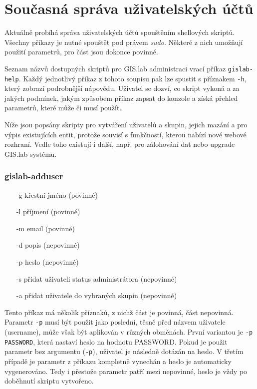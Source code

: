 \section{Současná správa uživatelských účtů}
\label{cmd-line}

Aktuálně probíhá správa uživatelských účtů spouštěním shellových skriptů. Všechny příkazy je nutné spouštět pod právem \textit{sudo}. Některé z nich umožňují použití parametrů, pro část jsou dokonce povinné.

Seznam názvů dostupných skriptů pro GIS.lab administraci vrací příkaz \texttt{gislab-help}. Každý jednotlivý příkaz z tohoto soupisu pak lze spustit s příznakem \texttt{-h}, který zobrazí podrobnější nápovědu. Uživatel se dozví, co skript vykoná a za jakých podmínek, jakým způsobem příkaz zapsat do konzole a získá přehled parametrů, které může či musí použít.

Níže jsou popsány skripty pro vytváření uživatelů a skupin, jejich mazání a pro výpis existujících entit, protože souvisí s funkčností, kterou nabízí nové webové rozhraní. Vedle toho existují i další, např. pro zálohování dat nebo upgrade GIS.lab systému.


\subsubsection{gislab-adduser}
\begin{itemize}
\item [-g] křestní jméno (povinné)
\item [-l] příjmení (povinné)
\item [-m] email (povinné)
\item [-d] popis (nepovinné)
\item [-p] heslo (nepovinné)
\item [-s] přidat uživateli status administrátora (nepovinné)
\item [-a] přidat uživatele do vybraných skupin (nepovinné)
\end{itemize}
Tento příkaz má několik příznaků, z nichž část je povinná, část nepovinná. Parametr \texttt{-p} musí být použit jako poslední, těsně před názvem uživatele (username), může však být aplikován v různých obměnách. První variantou je \texttt{-p PASSWORD}, která nastaví heslo na hodnotu PASSWORD. Pokud je použit parametr bez argumentu (\texttt{-p}), uživatel je následně dotázán na heslo. V třetím případě je parametr z příkazu kompletně vynechán a heslo je automaticky vygenerováno. Tedy i přestože parametr patří mezi nepovinné, heslo je vždy po doběhnutí skriptu vytvořeno.

